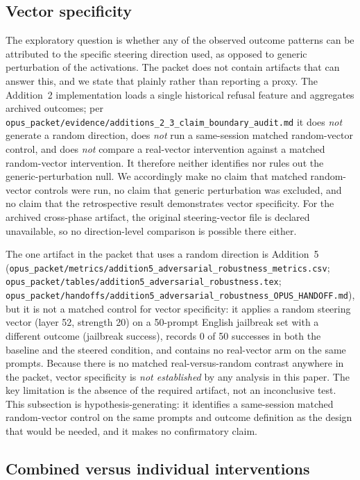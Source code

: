 \subsection{Vector specificity}

The exploratory question is whether any of the observed outcome patterns can be
attributed to the specific steering direction used, as opposed to generic
perturbation of the activations. The packet does not contain artifacts that can
answer this, and we state that plainly rather than reporting a proxy. The
Addition~2 implementation loads a single historical refusal feature and
aggregates archived outcomes; per
\texttt{opus\_packet/evidence/additions\_2\_3\_claim\_boundary\_audit.md} it does
\emph{not} generate a random direction, does \emph{not} run a same-session
matched random-vector control, and does \emph{not} compare a real-vector
intervention against a matched random-vector intervention. It therefore neither
identifies nor rules out the generic-perturbation null. We accordingly make no
claim that matched random-vector controls were run, no claim that generic
perturbation was excluded, and no claim that the retrospective result
demonstrates vector specificity. For the archived cross-phase artifact, the
original steering-vector file is declared unavailable, so no direction-level
comparison is possible there either.

The one artifact in the packet that uses a random direction is Addition~5
(\texttt{opus\_packet/metrics/addition5\_adversarial\_robustness\_metrics.csv};
\texttt{opus\_packet/tables/addition5\_adversarial\_robustness.tex};
\texttt{opus\_packet/handoffs/addition5\_adversarial\_robustness\_OPUS\_HANDOFF.md}),
but it is not a matched control for vector specificity: it applies a random
steering vector (layer 52, strength 20) on a 50-prompt English jailbreak set
with a different outcome (jailbreak success), records 0 of 50 successes in both
the baseline and the steered condition, and contains no real-vector arm on the
same prompts. Because there is no matched real-versus-random contrast anywhere
in the packet, vector specificity is \emph{not established} by any analysis in
this paper. The key limitation is the absence of the required artifact, not an
inconclusive test. This subsection is hypothesis-generating: it identifies a
same-session matched random-vector control on the same prompts and outcome
definition as the design that would be needed, and it makes no confirmatory
claim.

\subsection{Combined versus individual interventions}

